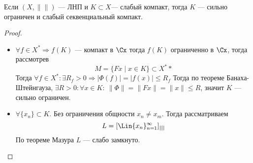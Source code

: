 \begin{theorem}
	Если $(X,\|\|)$ --- ЛНП и $K \subset X$--- слабый компакт, тогда $K$ --- сильно ограничен и слабый секвенциальный компакт.
\end{theorem}
\begin{proof}
	\begin{itemize}
		\item $\forall f \in X^* \Rightarrow f(K)$ --- компакт в $\Cx$ тогда $f(K)$ ограниченно в $\Cx$, тогда рассмотрев 
		$$
		M = \{Fx \mid x \in K\} \subset X^**
		$$
		Тогда $\forall f \in X^*\colon \exists R_f > 0 \Rightarrow |\Phi(f)| = |f(x)| \leq R_f$
		Тогда по теореме Банаха-Штейнгауза, $ \exists R > 0 \colon \forall x \in K: \ \|\Phi\| = \|Fx\| = \|x\| \leq R$, значит $K$ --- сильно ограничен.
		\item $\forall \{x_n\} \subset K$. Без ограничения общности $x_n \neq x_m$. Тогда рассматриваем 
		$$
		L = [\Lin \{x_n\}_{n=1}^\infty]_{\|\|}
		$$
		По теореме Мазура $L$ --- слабо замкнуто. 
	\end{itemize}

\end{proof}